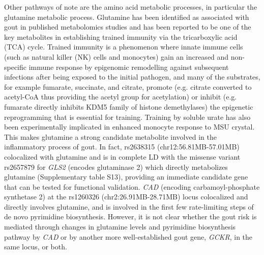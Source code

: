 \documentclass[a4paper,10pt]{article}
\begin{document}
Other pathways of note are the amino acid metabolic processes, in particular the glutamine metabolic process.
Glutamine has been identified as associated with gout in published metabolomics studies\citep{renaudin_gout_2020,joshi_prediagnostic_2023} and has been reported to be one of the key metabolites in establishing trained immunity via the tricarboxylic acid (TCA) cycle.
Trained immunity is a phenomenon where innate immune cells (such as natural killer (NK) cells and monocytes) gain an increased and non-spec\-ific immune response by epigenomic remodelling against subsequent infections after being exposed to the initial pathogen\citep{netea_trained_2011,arts_glutaminolysis_2016}, and many of the substrates, for example fumarate, succinate, and citrate, promote (e.g. citrate converted to acetyl-CoA thus providing the acetyl group for acetylation\citep{van_der_heijden_epigenetics_2018}) or inhibit (e.g. fumarate directly inhibits KDM5 family of histone demethylases\citep{arts_immunometabolic_2016,xiao_inhibition_2012}) the epigenetic reprogramming that is essential for training.
Training by soluble urate has also been experimentally implicated in enhanced monocyte response to MSU crystal\citep{straton_epigenomic_2024}.
This makes glutamine a strong candidate metabolite involved in the inflammatory process of gout.
In fact, rs2638315 (chr12:56.81MB-57.01MB) colocalized with glutamine and is in complete LD with the missense variant rs2657879 for \textit {GLS2}\citep{major_genome-wide_2024} (encodes glutaminase 2) which directly metabolizes glutamine (Supplementary table S13), providing an immediate candidate gene that can be tested for functional validation.
\textit{CAD} (encoding carbamoyl-phosphate synthetase 2) at the rs1260326 (chr2:26.91MB-28.71MB) locus colocalized and directly involves glutamine, and is involved in the first few rate-limiting steps of de novo pyrimidine biosynthesis\citep{li_pyrimidine_2021}.
However, it is not clear whether the gout risk is mediated through changes in glutamine levels and pyrimidine biosynthesis pathway by \textit{CAD} or by another more well-established gout gene, \textit{GCKR}, in the same locus, or both.
\\
\end{document}
